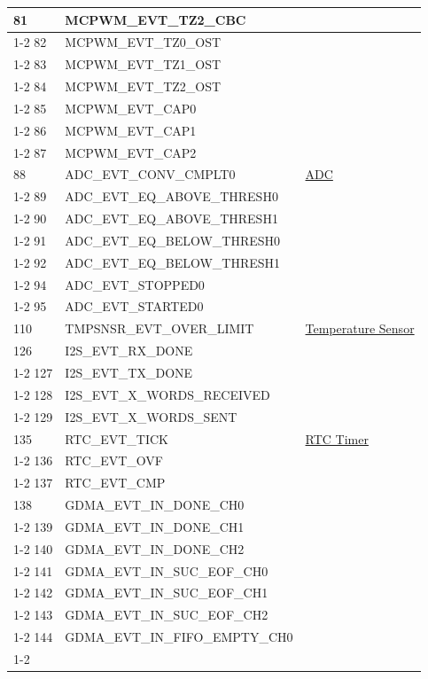 \documentclass[main\_\_EN.tex]{subfiles}
\begin{document}
\begin{longtable}{ | l | l | l | }
81  & MCPWM\_EVT\_TZ2\_CBC & \\ \cline{1-2}
82  & MCPWM\_EVT\_TZ0\_OST & \\ \cline{1-2}
83  & MCPWM\_EVT\_TZ1\_OST & \\ \cline{1-2}
84  & MCPWM\_EVT\_TZ2\_OST & \\ \cline{1-2}
85  & MCPWM\_EVT\_CAP0   & \\ \cline{1-2}
86  & MCPWM\_EVT\_CAP1   & \\ \cline{1-2}
87  & MCPWM\_EVT\_CAP2   & \\ \hline
88  & ADC\_EVT\_CONV\_CMPLT0    & \hyperref[mod:adc]{ADC}   \\ \cline{1-2}
89  & ADC\_EVT\_EQ\_ABOVE\_THRESH0     & \\ \cline{1-2}
90  & ADC\_EVT\_EQ\_ABOVE\_THRESH1     & \\ \cline{1-2}
91  & ADC\_EVT\_EQ\_BELOW\_THRESH0     & \\ \cline{1-2}
92  & ADC\_EVT\_EQ\_BELOW\_THRESH1     & \\ \cline{1-2}
94  & ADC\_EVT\_STOPPED0 & \\ \cline{1-2}
95  & ADC\_EVT\_STARTED0 & \\ \hline
110 & TMPSNSR\_EVT\_OVER\_LIMIT & \hyperref[mod:tmpsen]{Temperature Sensor}  \\ \hline
126 & I2S\_EVT\_RX\_DONE & \nameref{mod:i2s}   \\ \cline{1-2}
127 & I2S\_EVT\_TX\_DONE & \\ \cline{1-2}
128 & I2S\_EVT\_X\_WORDS\_RECEIVED     & \\ \cline{1-2}
129 & I2S\_EVT\_X\_WORDS\_SENT  & \\ \hline
135 & RTC\_EVT\_TICK     & \hyperref[mod:lowpowm]{RTC Timer}   \\ \cline{1-2}
136 & RTC\_EVT\_OVF      & \\ \cline{1-2}
137 & RTC\_EVT\_CMP      & \\ \hline
138 & GDMA\_EVT\_IN\_DONE\_CH0  & \nameref{mod:dma} \\ \cline{1-2}
139 & GDMA\_EVT\_IN\_DONE\_CH1  & \\ \cline{1-2}
140 & GDMA\_EVT\_IN\_DONE\_CH2  & \\ \cline{1-2}
141 & GDMA\_EVT\_IN\_SUC\_EOF\_CH0     & \\ \cline{1-2}
142 & GDMA\_EVT\_IN\_SUC\_EOF\_CH1     & \\ \cline{1-2}
143 & GDMA\_EVT\_IN\_SUC\_EOF\_CH2     & \\ \cline{1-2}
144 & GDMA\_EVT\_IN\_FIFO\_EMPTY\_CH0  & \\ \cline{1-2}

\end{longtable}
\end{document}
